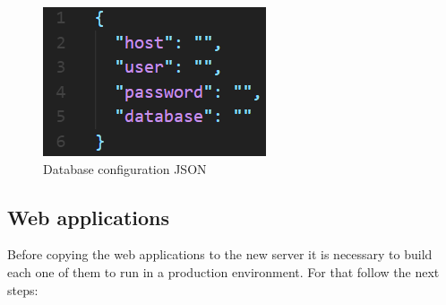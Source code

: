 \begin{figure}[ht]
    \centering
    \includegraphics[width=0.5\linewidth]{lib/images/deploy/server/db_config.png}
    \caption{Database configuration JSON}
    \label{fig:db_config}
\end{figure}

\subsection{Web applications}

Before copying the web applications to the new server it is necessary to build each one of them to run in a production environment. For that follow the next steps:

